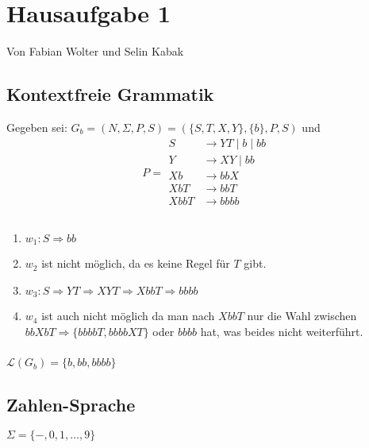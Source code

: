 \documentclass[a4paper, fleqn]{article}
\begin{document}
\section*{Hausaufgabe 1}
Von Fabian Wolter und Selin Kabak
\setcounter{section}{2}
\setcounter{subsection}{7}
\subsection{Kontextfreie Grammatik}
Gegeben sei: $G_b=(N,\Sigma,P,S)=(\{S,T,X,Y\},\{b\},P,S)$ und
\[ P=
\begin{split}
    S&\rightarrow YT \mid b \mid bb\\
    Y&\rightarrow XY \mid bb\\
    Xb&\rightarrow bbX\\
    XbT&\rightarrow bbT\\
    XbbT&\rightarrow bbbb\\
\end{split}
\]
\subsubsection{}
\begin{enumerate}[label=\alph*)]
    \item $w_1 : S\Rightarrow bb$
    \item $w_2$ ist nicht möglich, da es keine Regel für $T$ gibt.
    \item $w_3 : S\Rightarrow YT\Rightarrow XYT\Rightarrow XbbT\Rightarrow bbbb$
    \item $w_4$ ist auch nicht möglich da man nach $XbbT$ nur die Wahl zwischen\\
    $bbXbT\Rightarrow \{bbbbT, bbbbXT\}$ oder $bbbb$ hat, was beides nicht weiterführt.
\end{enumerate}
\subsubsection{}
$\mathcal{L}(G_b)=\{b,bb,bbbb\}$
\subsection{Zahlen-Sprache}
$\Sigma=\{-,0,1,\dots,9\}$
\end{document}
